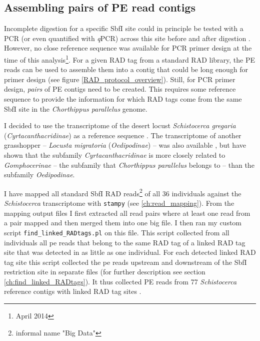 \documentclass[a4paper,12pt,times,print,index,custombib,custommargin]{PhDThesisPSnPDF}\usepackage[]{graphicx}\usepackage[]{color}
\begin{document}
\subsection{Assembling pairs of PE read contigs}

Incomplete digestion for a specific SbfI site could in principle be tested with a PCR (or even quantified with \textit{q}PCR) across this site before and after digestion \citep{Luca2011}. However, no close reference sequence was available for PCR primer design at the time of this analysis\footnote{April 2014}. For a given \gls{RAD tag} from a standard RAD library, the PE reads can be used to assemble them into a \gls{contig} that could be long enough for primer design (see figure \ref{RAD_protocol_overview}).
Still, for PCR primer design, \emph{pairs} of PE \glspl{contig} need to be created. This requires some reference sequence to provide the information for which \glspl{RAD tag} come from the same SbfI site in the \textit{Chorthippus parallelus} genome.

I decided to use the transcriptome of the desert locust \textit{Schistocerca gregaria} (\textit{Cyrtacanthacridinae}) as a reference sequence \citep{Badisco2011} . The transcriptome of another grasshopper -- \textit{Locusta migratoria} (\textit{Oedipodinae}) -- was also available \citep{Kang2004}, but \cite{Liu2008a} have shown that the subfamily \textit{Cyrtacanthacridinae} is more closely related to \textit{Gomphocerinae} -- the subfamily that \textit{Chorthippus parallelus} belongs to -- than the subfamily \textit{Oedipodinae}.

I have mapped all standard SbfI RAD reads\footnote{informal name "Big Data"} of all 36 individuals against the \textit{Schistocerca} transcriptome with \texttt{stampy} \citep{Lunter2011} (see \vref{ch:read_mapping}). From the mapping output files I first extracted all read pairs where at least one read from a pair mapped and then merged them into one big file. I then ran my custom script \texttt{find\_linked\_RADtags.pl} on this file. This script collected from all individuals all \gls{pe} reads that belong to the same \gls{RAD tag} of a \gls{linked RAD tag site} that was detected in as little as one individual. For each detected \gls{linked RAD tag site} this script collected the \gls{pe} reads upstream and downstream of the SbfI restriction site in separate files (for further description see section \ref{ch:find_linked_RADtags}). It thus collected PE reads from 77 \textit{Schistocerca} reference contigs with \glspl{linked RAD tag site} .
\end{document}

